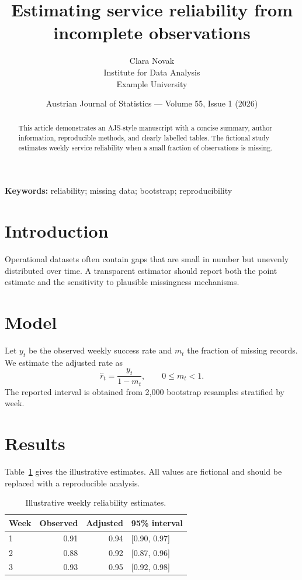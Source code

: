 \documentclass[11pt,a4paper]{article}
\title{Estimating service reliability from incomplete observations}
\author{Clara Novak\\\small Institute for Data Analysis\\\small Example University}
\date{Austrian Journal of Statistics --- Volume 55, Issue 1 (2026)}
\begin{document}
\maketitle
\begin{abstract}
This article demonstrates an AJS-style manuscript with a concise summary,
author information, reproducible methods, and clearly labelled tables. The
fictional study estimates weekly service reliability when a small fraction of
observations is missing.
\end{abstract}
\textbf{Keywords:} reliability; missing data; bootstrap; reproducibility

\section{Introduction}
Operational datasets often contain gaps that are small in number but unevenly
distributed over time. A transparent estimator should report both the point
estimate and the sensitivity to plausible missingness mechanisms.

\section{Model}
Let $y_t$ be the observed weekly success rate and $m_t$ the fraction of
missing records. We estimate the adjusted rate as
\begin{equation}
  \widehat{r}_t = \frac{y_t}{1-m_t}, \qquad 0 \leq m_t < 1.
\end{equation}
The reported interval is obtained from 2,000 bootstrap resamples stratified
by week.

\section{Results}
Table~\ref{tab:estimate} gives the illustrative estimates. All values are
fictional and should be replaced with a reproducible analysis.
\begin{table}[ht]
\centering
\caption{Illustrative weekly reliability estimates.}
\label{tab:estimate}
\begin{tabularx}{0.78\linewidth}{@{}lrrX@{}}
\toprule
Week & Observed & Adjusted & 95\% interval \\
\midrule
1 & 0.91 & 0.94 & [0.90, 0.97] \\
2 & 0.88 & 0.92 & [0.87, 0.96] \\
3 & 0.93 & 0.95 & [0.92, 0.98] \\
\bottomrule
\end{tabularx}
\end{table}
\end{document}
